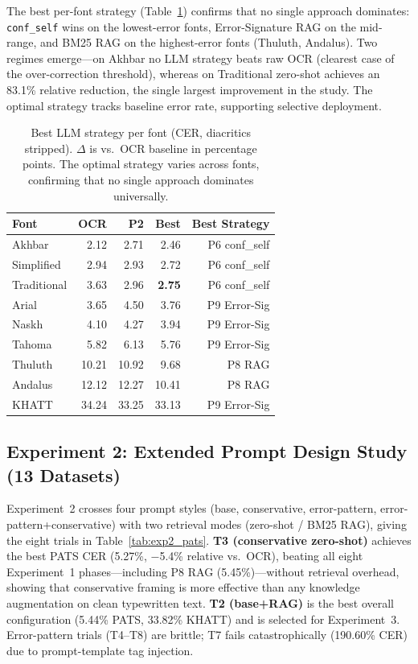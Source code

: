 \documentclass[conference]{IEEEtran}
\begin{document}
The best per-font strategy (Table~\ref{tab:perfont}) confirms that no single
approach dominates: \texttt{conf\_self} wins on the lowest-error fonts,
Error-Signature RAG on the mid-range, and BM25 RAG on the highest-error fonts
(Thuluth, Andalus). Two regimes emerge---on Akhbar no LLM strategy beats raw
OCR (clearest case of the over-correction threshold), whereas on Traditional
zero-shot achieves an 83.1\% relative reduction, the single largest improvement
in the study. The optimal strategy tracks baseline error rate, supporting
selective deployment.

\begin{table}[t]
\caption{Best LLM strategy per font (CER, diacritics stripped). $\Delta$ is
vs.\ OCR baseline in percentage points. The optimal strategy varies across
fonts, confirming that no single approach dominates universally.}
\label{tab:perfont}
\begin{center}
\small
\begin{tabular}{lrrrr}
\toprule
\textbf{Font} & \textbf{OCR} & \textbf{P2} & \textbf{Best} & \textbf{Best Strategy} \\
\midrule
Akhbar       &  2.12 &  2.71 &  2.46 & P6 conf\_self \\
Simplified   &  2.94 &  2.93 &  2.72 & P6 conf\_self \\
Traditional  &  3.63 &  2.96 &  \textbf{2.75} & P6 conf\_self \\
Arial        &  3.65 &  4.50 &  3.76 & P9 Error-Sig \\
Naskh        &  4.10 &  4.27 &  3.94 & P9 Error-Sig \\
Tahoma       &  5.82 &  6.13 &  5.76 & P9 Error-Sig \\
Thuluth      & 10.21 & 10.92 &  9.68 & P8 RAG \\
Andalus      & 12.12 & 12.27 & 10.41 & P8 RAG \\
\midrule
KHATT        & 34.24 & 33.25 & 33.13 & P9 Error-Sig \\
\bottomrule
\end{tabular}
\end{center}
\end{table}

\subsection{Experiment 2: Extended Prompt Design Study (13 Datasets)}

Experiment~2 crosses four prompt styles (base, conservative, error-pattern,
error-pattern+conservative) with two retrieval modes (zero-shot / BM25 RAG),
giving the eight trials in Table~\ref{tab:exp2_pats}. \textbf{T3 (conservative
zero-shot)} achieves the best PATS CER (5.27\%, $-$5.4\% relative vs.\ OCR),
beating all eight Experiment~1 phases---including P8 RAG (5.45\%)---without
retrieval overhead, showing that conservative framing is more effective than any
knowledge augmentation on clean typewritten text. \textbf{T2 (base+RAG)} is the
best overall configuration (5.44\% PATS, 33.82\% KHATT) and is selected for
Experiment~3. Error-pattern trials (T4--T8) are brittle; T7 fails catastrophically
(190.60\% CER) due to prompt-template tag injection.
\end{document}
